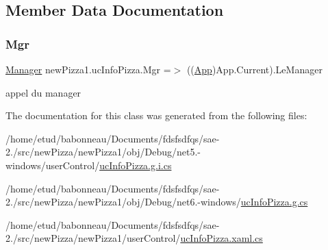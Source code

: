 \subsection{Member Data Documentation}
\mbox{\label{classnewPizza1_1_1ucInfoPizza_ade399f2ed146dd3b5b0a4784a8670652}} 
\subsubsection{\texorpdfstring{Mgr}{Mgr}}
{\footnotesize\ttfamily \hyperlink{classModele_1_1Manager}{Manager} new\+Pizza1.\+uc\+Info\+Pizza.\+Mgr =$>$ ((\hyperlink{classnewPizza1_1_1App}{App})App.\+Current).Le\+Manager}



appel du manager 



The documentation for this class was generated from the following files\+:\begin{DoxyCompactItemize}
\item 
/home/etud/babonneau/\+Documents/fdsfsdfqs/sae-\/2./src/new\+Pizza/new\+Pizza1/obj/\+Debug/net5.-\/windows/user\+Control/\hyperlink{net5_80-windows_2userControl_2ucInfoPizza_8g_8i_8cs}{uc\+Info\+Pizza.\+g.\+i.\+cs}\item 
/home/etud/babonneau/\+Documents/fdsfsdfqs/sae-\/2./src/new\+Pizza/new\+Pizza1/obj/\+Debug/net6.-\/windows/\hyperlink{Debug_2net6_80-windows_2ucInfoPizza_8g_8cs}{uc\+Info\+Pizza.\+g.\+cs}\item 
/home/etud/babonneau/\+Documents/fdsfsdfqs/sae-\/2./src/new\+Pizza/new\+Pizza1/user\+Control/\hyperlink{ucInfoPizza_8xaml_8cs}{uc\+Info\+Pizza.\+xaml.\+cs}\end{DoxyCompactItemize}
